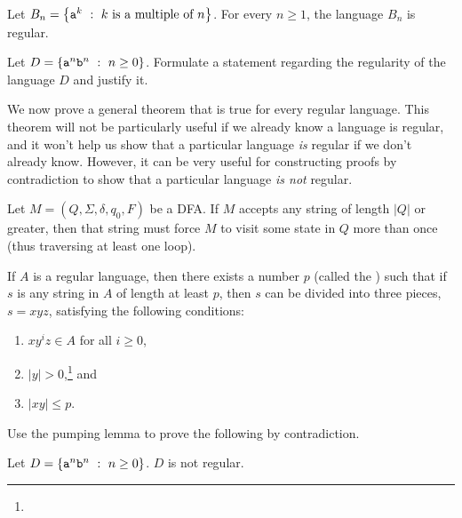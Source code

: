 \documentclass[twoside,letterpaper,openany]{book}
\begin{document}
\begin{thm2}
Let $B_n = \left\lbrace {\texttt{a}}^k\ :\ k~\textrm{is a multiple of}~n \right\rbrace$. For every $n \geq 1$, the language $B_n$ is regular.
\end{thm2}

\begin{exer2}
Let $D = \left\lbrace {\texttt{a}}^n {\texttt{b}}^n\ :\ n \geq 0 \right\rbrace$. Formulate a statement regarding the regularity of the language $D$ and justify it.
\end{exer2}

\begin{discussion}
We now prove a general theorem that is true for every regular language. This theorem will not be particularly useful if we already know a language is regular, and it won't help us show that a particular language \emph{is} regular if we don't already know. However, it can be very useful for constructing proofs by contradiction to show that a particular language \emph{is not} regular.
\end{discussion}

\begin{lemma2}
Let $M = (Q, \Sigma, \delta, q_0, F)$ be a DFA. If $M$ accepts any string of length $|Q|$ or greater, then that string must force $M$ to visit some state in $Q$ more than once (thus traversing at least one loop).
\end{lemma2}

\begin{thm3}
If $A$ is a regular language, then there exists a number $p$ (called the ) such that if $s$ is any string in $A$ of length at least $p$, then $s$ can be divided into three pieces, $s = xyz$, satisfying the following conditions:
\begin{enumerate}
\item $xy^iz \in A$ for all $i \geq 0$,
\item $|y| > 0$,\footnote{} and
\item $|xy| \leq p$.
\end{enumerate}
\end{thm3}

\begin{discussion}
Use the pumping lemma to prove the following by contradiction.
\end{discussion}

\begin{thm2}
Let $D = \left\lbrace {\texttt{a}}^n {\texttt{b}}^n\ :\ n \geq 0 \right\rbrace$. $D$ is not regular.
\end{thm2}
\end{document}
